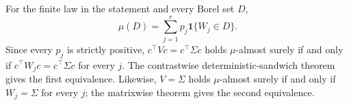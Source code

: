 For the finite law in the statement and every Borel set \(D\),
\[
 \mu(D)=\sum_{j=1}^rp_j\mathbf1\{W_j\in D\}.
\tag{1}
\]
Since every \(p_j\) is strictly positive, \(c^\top Vc=c^\top\Sigma c\) holds \(\mu\)-almost surely if and only if \(c^\top W_jc=c^\top\Sigma c\) for every \(j\).  The contrastwise deterministic-sandwich theorem gives the first equivalence.  Likewise, \(V=\Sigma\) holds \(\mu\)-almost surely if and only if \(W_j=\Sigma\) for every \(j\); the matrixwise theorem gives the second equivalence.